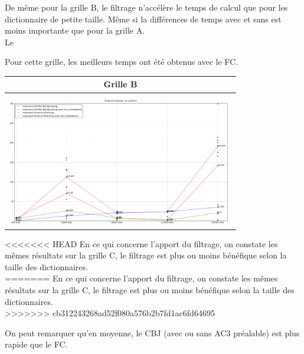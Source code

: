 \documentclass[a4paper,12pt]{report}
\begin{document}
\begin{enumerate}
\begin{table}[!h]
\begin{center}
\begin{tabular}{|c|}
\end{tabular}
\end{center}
\end{table}

De même pour la grille B, le filtrage n'accélère le temps de calcul que pour les dictionnaire de petite taille. Même si la différences de temps avec et sans est moins importante que pour la grille A.\\

Le

Pour cette grille, les meilleurs temps ont été obtenus avec le FC.\\

\begin{table}[!h]
\begin{center}
\begin{tabular}{|c|}

\hline
Grille B \\
\hline 
\\
\includegraphics[width=10cm]{Grille_B.png} \\
\hline


\end{tabular}
\end{center}
\end{table}

<<<<<<< HEAD
En ce qui concerne l'apport du filtrage, on constate les mêmes résultats sur la grille C, le filtrage est plus ou moins bénéfique selon la taille des dictionnaires. \\
=======
En ce qui concerne l'apport du filtrage, on constate les mêmes résultats sur la grille C, le filtrage est plus ou moins bénéfique selon la taille des dictionnaires. \\
>>>>>>> cb312243268ad52f080a576b2b7fd1ac6fd64695

On peut remarquer qu'en moyenne, le CBJ (avec ou sans AC3 préalable) est plus rapide que le FC.\\


\end{enumerate}
\end{document}
